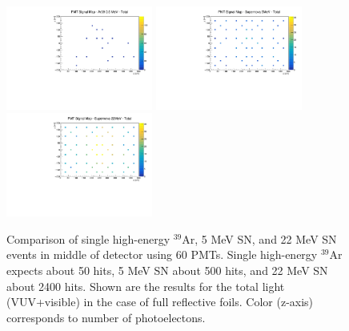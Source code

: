 \documentclass[a4paper]{article}
\begin{document}
\begin{figure}[H]
\center
\includegraphics[width=0.43\textwidth]{ar39_signal_map_rebin_fastlight_2.pdf}
\includegraphics[width=0.43\textwidth]{sn_signal_map_rebin_improved_fastlight.pdf}
\includegraphics[width=0.43\textwidth]{sn_signal_map_higherE_rebin_improved_fastlight.pdf}
\caption{Comparison of single high-energy $^{39}$Ar, 5 MeV SN, and 22 MeV SN events in middle of detector using 60 PMTs. Single high-energy $^{39}$Ar expects about 50 hits, 5 MeV SN about 500 hits, and 22 MeV SN about 2400 hits. Shown are the results for the total light (VUV+visible) in the case of full reflective foils. Color (z-axis) corresponds to number of photoelectons.}\label{signal_maps_rebin_fastlight}
\end{figure}
\end{document}
